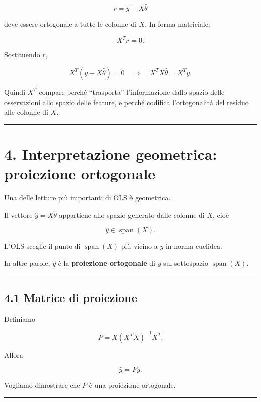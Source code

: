 \documentclass{article}
\begin{document}
\[
r = y-X\hat\theta
\]

deve essere ortogonale a tutte le colonne di \(X\). In forma matriciale:

\[
X^Tr=0.
\]

Sostituendo \(r\),

\[
X^T(y-X\hat\theta)=0
\quad\Longrightarrow\quad
X^TX\hat\theta=X^Ty.
\]

Quindi \(X^T\) compare perché ``trasporta'' l'informazione dallo spazio
delle osservazioni allo spazio delle feature, e perché codifica
l'ortogonalità del residuo alle colonne di \(X\).

\begin{center}\rule{0.5\linewidth}{0.5pt}\end{center}

\section{4. Interpretazione geometrica: proiezione
ortogonale}\label{interpretazione-geometrica-proiezione-ortogonale}

Una delle letture più importanti di OLS è geometrica.

Il vettore \(\hat y = X\hat\theta\) appartiene allo spazio generato
dalle colonne di \(X\), cioè

\[
\hat y \in \operatorname{span}(X).
\]

L'OLS sceglie il punto di \(\operatorname{span}(X)\) più vicino a \(y\)
in norma euclidea.

In altre parole, \(\hat y\) è la \textbf{proiezione ortogonale} di \(y\)
sul sottospazio \(\operatorname{span}(X)\).

\begin{center}\rule{0.5\linewidth}{0.5pt}\end{center}

\subsection{4.1 Matrice di proiezione}\label{matrice-di-proiezione}

Definiamo

\[
P = X(X^TX)^{-1}X^T.
\]

Allora

\[
\hat y = Py.
\]

Vogliamo dimostrare che \(P\) è una proiezione ortogonale.

\begin{center}\rule{0.5\linewidth}{0.5pt}\end{center}
\end{document}
